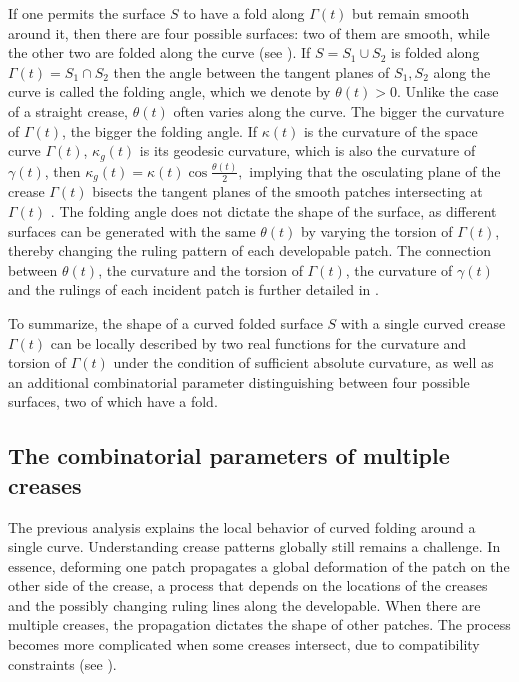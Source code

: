 If one permits the surface $S$ to have a fold along $\Gamma(t)$ but remain smooth around it, then there are four possible surfaces: two of them are smooth, while the other two are folded along the curve (see ). If $S = S_1 \cup S_2$ is folded along $\Gamma(t) = S_1 \cap S_2$ then the angle between the tangent planes of $S_1,S_2$ along the curve is called the folding angle, which we denote by $\theta(t) > 0$. Unlike the case of a straight crease, $\theta(t)$ often varies along the curve.  The bigger the curvature of $\Gamma(t)$, the bigger the folding angle. If $\kappa(t)$ is the curvature of the space curve $\Gamma(t)$, $\kappa_g(t)$ is its geodesic curvature, which is also the curvature of $\gamma(t)$, then $\kappa_g(t) = \kappa(t) \cos\frac{\theta(t)}{2},$ implying that the osculating plane of the crease $\Gamma(t)$ bisects the tangent planes of the smooth patches intersecting at $\Gamma(t)$ \cite{curved_folding_kilian,duncan_folded}. The folding angle does not dictate the shape of the surface, as different surfaces can be generated with the same $\theta(t)$ by varying the torsion of $\Gamma(t)$, thereby changing the ruling pattern of each developable patch. The connection between $\theta(t)$, the curvature and the torsion of $\Gamma(t)$, the curvature of $\gamma(t)$ and the rulings of each incident patch is further detailed in \cite{demaine2018conic}.

To summarize, the shape of a curved folded surface $S$ with a single curved crease $\Gamma(t)$ can be locally described by two {real functions} for the curvature and torsion of $\Gamma(t)$ under the condition of sufficient absolute curvature, as well as an additional combinatorial parameter distinguishing between four possible surfaces, two of which have a fold.
 
\subsection{The combinatorial parameters of multiple creases}
The previous analysis explains the local behavior of curved folding around a single curve. Understanding crease patterns globally still remains a challenge. In essence, deforming one patch propagates a global deformation of the patch on the other side of the crease, a process that depends on the locations of the creases and the possibly changing ruling lines along the developable. When there are multiple creases, the propagation dictates the shape of other patches. The process becomes more complicated when some creases intersect, due to compatibility constraints (see ). 

